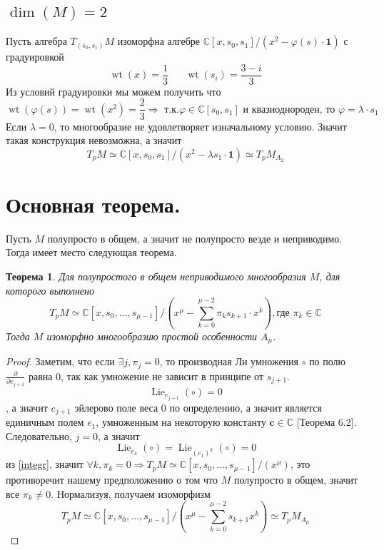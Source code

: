 \documentclass[a4paper, 10pt]{article}
\theoremstyle{plain}
\newtheorem{theorem}{Теорема}
\newcommand{\tang}[1][\hspace{0pt}]{\frac{\partial }{\partial #1}}
\begin{document}
\subsection{\texorpdfstring{\(\operatorname{dim}(M) = 2\)}{2}}
Пусть алгебра \(T_{(s_0, s_1)}M\) изоморфна алгебре \(\mathbb{C}[x, s_0, s_1]\Big/(x^2 - \varphi(s)\cdot \mathbf{1})\) с градуировкой \[\operatorname{wt}(x) = \dfrac{1}{3} \hspace{20pt} \operatorname{wt}(s_i) = \dfrac{3 - i}{3}\]
Из условий градуировки мы можем получить что \[\operatorname{wt}(\varphi(s)) = \operatorname{wt}(x^2) = \dfrac{2}{3} \Rightarrow \text{ т.к.} \varphi \in \mathbb{C}[s_0, s_1] \text{ и квазиоднороден, то } \varphi = \lambda \cdot s_1\]
Если \(\lambda = 0\), то многообразие не удовлетворяет изначальному условию. Значит такая конструкция невозможна, а значит \[T_pM \simeq \mathbb{C}[x, s_0, s_1]\Big/(x^2 - \lambda s_1\cdot \mathbf{1}) \simeq T_pM_{A_2}\]

\section{Основная теорема.}
Пусть \(M\) полупросто в общем, а значит не полупросто везде и неприводимо. Тогда имеет место следующая теорема.
\begin{theorem}
    Для полупростого в общем неприводимого многообразия \(M\), для которого выполнено
    \[
    T_pM \simeq \mathbb{C}\left[x, s_0, \dots, s_{\mu - 1}\right]/\left(x^{\mu} - \sum_{k = 0}^{\mu - 2} \pi_k s_{k+1} \cdot x^k\right), \text{где } \pi_k \in \mathbb{C}
    \]  Тогда \(M\) изоморфно многообразию простой особенности \(A_{\mu}\).
\end{theorem}
\begin{proof}
    Заметим, что если \(\exists j, \pi_j = 0\), то производная Ли умножения \(\circ\) по полю \(\tang[e_{j+1}]\) равна 0, так как умножение не зависит в принципе от \(s_{j+1}\).\[\operatorname{Lie}_{e_{j+1}}(\circ) = 0\], а значит \(e_{j+1}\) эйлерово поле веса 0 по определению, а значит является единичным полем \(e_1\), умноженным на некоторую константу \(\mathbf{c}\in \mathbb{C}\) [Теорема 6.2]\cite{hertling1999multiplicationtangentbundle}. Следовательно, \(j=0\), а значит \[\operatorname{Lie}_{e_k}(\circ) = \operatorname{Lie}_{(e_1)^k}(\circ) = 0 \] из \ref{integr}, значит \(\forall k, \pi_k =0 \Rightarrow T_pM \simeq \mathbb{C}\left[x, s_0, \dots, s_{\mu - 1}\right]/ (x^\mu)\), это противоречит нашему предположению о том что \(M\) полупросто в общем, значит все \(\pi_k \neq 0\). Нормализуя, получаем изоморфизм \[ T_pM \simeq \mathbb{C}\left[x, s_0, \dots, s_{\mu - 1}\right]/\left(x^{\mu} - \sum_{k = 0}^{\mu - 2} s_{k+1} x^k\right)\simeq T_pM_{A_\mu}\]
\end{proof}
\end{document}
